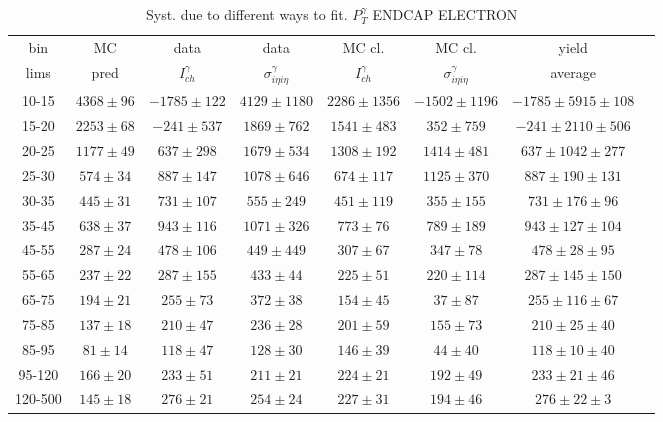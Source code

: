 \begin{table}[h]
  \tiny
  \begin{center}
  \caption{Syst. due to different ways to fit. $P_T^{\gamma}$ ENDCAP ELECTRON}
  \begin{tabular}{|c|c|c|c|c|c|c|c|}
    bin &  MC   & data  & data  & MC cl. & MC cl. & yield\\ 
    lims & pred & $I_{ch}^{\gamma}$ & $\sigma_{i\eta i\eta}^\gamma$  & $I_{ch}^{\gamma}$  & $\sigma_{i\eta i\eta}^\gamma$   & average \\ \hline
     10-15 & $4368\pm96$ & $-1785\pm122$ & $4129\pm1180$ & $2286\pm1356$ & $-1502\pm1196$ &$-1785\pm5915\pm108$  \\ \hline
    15-20 & $2253\pm68$ & $-241\pm537$ & $1869\pm762$ & $1541\pm483$ & $352\pm759$ &$-241\pm2110\pm506$  \\ \hline
    20-25 & $1177\pm49$ & $637\pm298$ & $1679\pm534$ & $1308\pm192$ & $1414\pm481$ &$637\pm1042\pm277$  \\ \hline
    25-30 & $574\pm34$ & $887\pm147$ & $1078\pm646$ & $674\pm117$ & $1125\pm370$ &$887\pm190\pm131$  \\ \hline
    30-35 & $445\pm31$ & $731\pm107$ & $555\pm249$ & $451\pm119$ & $355\pm155$ &$731\pm176\pm96$  \\ \hline
    35-45 & $638\pm37$ & $943\pm116$ & $1071\pm326$ & $773\pm76$ & $789\pm189$ &$943\pm127\pm104$  \\ \hline
    45-55 & $287\pm24$ & $478\pm106$ & $449\pm449$ & $307\pm67$ & $347\pm78$ &$478\pm28\pm95$  \\ \hline
    55-65 & $237\pm22$ & $287\pm155$ & $433\pm44$ & $225\pm51$ & $220\pm114$ &$287\pm145\pm150$  \\ \hline
    65-75 & $194\pm21$ & $255\pm73$ & $372\pm38$ & $154\pm45$ & $37\pm87$ &$255\pm116\pm67$  \\ \hline
    75-85 & $137\pm18$ & $210\pm47$ & $236\pm28$ & $201\pm59$ & $155\pm73$ &$210\pm25\pm40$  \\ \hline
    85-95 & $81\pm14$ & $118\pm47$ & $128\pm30$ & $146\pm39$ & $44\pm40$ &$118\pm10\pm40$  \\ \hline
    95-120 & $166\pm20$ & $233\pm51$ & $211\pm21$ & $224\pm21$ & $192\pm49$ &$233\pm21\pm46$  \\ \hline
    120-500 & $145\pm18$ & $276\pm21$ & $254\pm24$ & $227\pm31$ & $194\pm46$ &$276\pm22\pm3$  \\ \hline
  \end{tabular}
  \label{tab:diff_ways_to_fit_phoEt_ENDCAP_electron}
  \end{center}
\end{table}

